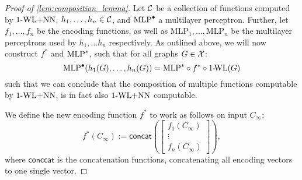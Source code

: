 \begin{proof}[Proof of \cref{lem:composition_lemma}]
    Let $\mathcal{C}$ be a collection of functions computed by $\text{1-WL+NN}$, $h_1, \dots ,h_n \in \mathcal{C}$, and $\text{MLP}^\bullet$ a multilayer perceptron. Further, let $f_{1}, \ldots, f_{n}$ be the encoding functions, as well as $\text{MLP}_1, \ldots, \text{MLP}_n$ be the multilayer perceptrons used by $h_1, \dots h_n$ respectively. As outlined above, we will now construct $f^*$ and $\text{MLP}^*$, such that for all graphs $G \in \mathcal{X}$:
    \begin{equation*}
        \text{MLP}^\bullet(h_1(G), \dots ,h_n(G)) = \text{MLP}^* \circ f^* \circ \text{1-\!WL}(G)
    \end{equation*}
    such that we can conclude that the composition of multiple functions computable by $\text{1-WL+NN}$, is in fact also $\text{1-WL+NN}$ computable. 

    We define the new encoding function $f^*$ to work as follows on input $C_\infty$:
    \begin{equation*}
        f^*(C_\infty) := \textsf{concat}(
            \begin{bmatrix}
                f_1(C_\infty)\\
                \vdots\\
                f_n(C_\infty)
            \end{bmatrix}),
    \end{equation*}
    where $\textsf{conccat}$ is the concatenation functions, concatenating all encoding vectors to one single vector.


\end{proof}
